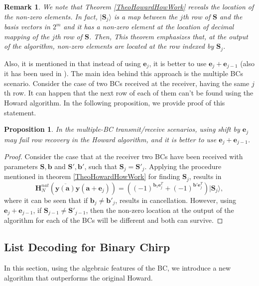 \documentclass[lettersize,journal,onecolumn]{IEEEtran}
\newtheorem{proposition}{Proposition}
\newtheorem{remark}{Remark}
\begin{document}
\begin{remark}
We note that Theorem \ref{TheoHowardHowWork} reveals the location of the non-zero elements. In fact, $|\mathbf{S}_j \rangle$ is a map between the $j$th row of $\mathbf{S}$ and the basis vectors in $2^m$ and it has a non-zero element at the location of decimal mapping of the $j$th row of $\mathbf{S}$. Then, This theorem emphasizes that, at the output of the algorithm, non-zero elements are located at the row indexed by $\mathbf{S}_j$.
\end{remark}

Also, it is mentioned in \cite{HowardAlg08} that instead of using $\mathbf{e}_j$, it is better to use $\mathbf{e}_j+\mathbf{e}_{j-1}$ (also it has been used in \cite{CHIRRUP19}). The main idea behind this approach is the multiple BCs scenario. Consider the case of two BCs received at the receiver, having the same $j$th row. It can happen that the next row of each of them can't be found using the Howard algorithm. In the following proposition, we provide proof of this statement.
\begin{proposition}
	In the multiple-BC transmit/receive scenarios, using shift by $\mathbf{e}_j$ may fail row recovery in the Howard algorithm, and it is better to use $\mathbf{e}_j+\mathbf{e}_{j-1}$.
\end{proposition}
\begin{proof}
	Consider the case that at the receiver two BCs have been received with parameters $\mathbf{S}, \mathbf{b}$ and $\mathbf{S}', \mathbf{b}'$, such that $\mathbf{S}_{j}=\mathbf{S}'_{j}$. Applying the procedure mentioned in theorem \ref{TheoHowardHowWork} for finding $\mathbf{S}_{j}$, results in
	\begin{equation}
		\mathbf{H}^{nat}_N\left(\overline{\mathbf{y}\left(\mathbf{a}\right)} \mathbf{y}\left(\mathbf{a+e}_j\right) \right) = \left((-1)^{\mathbf{b}_1 \mathbf{e}_j^T}+(-1)^{\mathbf{b}' \mathbf{e}_j^T}\right) |\mathbf{S}_{j} \rangle,
	\end{equation}
where it can be seen that if $\mathbf{b}_j \neq \mathbf{b}'_j$, results in cancellation. However, using $\mathbf{e}_j+\mathbf{e}_{j-1}$, if $\mathbf{S}_{j-1}\neq \mathbf{S}'_{j-1}$, then the non-zero location at the output of the algorithm for each of the BCs will be different and both can survive.
\end{proof}
\subsection{List Decoding for Binary Chirp}
In  this section, using the algebraic features of the BC, we introduce a new algorithm that outperforms the original Howard. 
\end{document}
